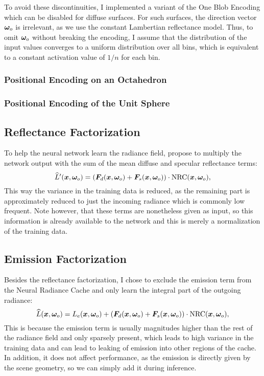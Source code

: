 To avoid these discontinuities, I implemented a variant of the One Blob Encoding which can be disabled for diffuse surfaces.
For such surfaces, the direction vector $\bm{\omega}_o$ is irrelevant, as we use the constant Lambertian reflectance model.
Thus, to omit $\bm{\omega}_o$ without breaking the encoding, I assume that the distribution of the input values converges to a uniform distribution over all bins, which is equivalent to a constant activation value of $1 / n$ for each bin.

\subsubsection{Positional Encoding on an Octahedron}

\subsubsection{Positional Encoding of the Unit Sphere}

\subsection{Reflectance Factorization}
To help the neural network learn the radiance field, \textcite{muller2021} propose to multiply the network output with the sum of the mean diffuse and specular reflectance terms:
\begin{equation}
    \widehat{L}'(\vec{x}, \wo) = \left( \vec{F}_d(\vec{x}, \wo) + \vec{F}_s(\vec{x}, \wo) \right) \cdot \mathrm{NRC}(\vec{x}, \wo),
\end{equation}
This way the variance in the training data is reduced, as the remaining part is approximately reduced to just the incoming radiance which is commonly low frequent.
Note however, that these terms are nonetheless given as input, so this information is already available to the network and this is merely a normalization of the training data.

\subsection{Emission Factorization}
Besides the reflectance factorization, I chose to exclude the emission term from the Neural Radiance Cache and only learn the integral part of the outgoing radiance:
\begin{equation}
    \widehat{L}(\vec{x}, \wo) = L_e(\vec{x}, \wo) + \left( \vec{F}_d(\vec{x}, \wo) + \vec{F}_s(\vec{x}, \wo) \right) \cdot \mathrm{NRC}(\vec{x}, \wo),
\end{equation}
This is because the emission term is usually magnitudes higher than the rest of the radiance field and only sparsely present, which leads to high variance in the training data and can lead to leaking of emission into other regions of the cache.
In addition, it does not affect performance, as the emission is directly given by the scene geometry, so we can simply add it during inference.

